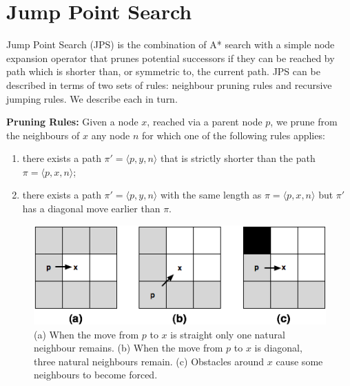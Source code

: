 \section{Jump Point Search}
\label{sec::jps}
Jump Point Search (JPS) is the combination of A* search with a simple
node expansion operator that prunes potential successors if
they can be reached by path which is shorter than, or symmetric to,
the current path. JPS can be described in terms of two sets of 
rules: neighbour pruning rules and recursive jumping rules.
We describe each in turn.

\textbf{Pruning Rules:}
Given a node $x$, reached via a parent node $p$,
we prune from the neighbours of $x$ any node $n$ for which one 
of the following rules applies:
\begin{enumerate}
\item 
  there exists a path $\pi' = \langle p,y,n \rangle$
  that is strictly shorter than the path $\pi = \langle p,x,n \rangle$; 
\item 
  there exists a path $\pi' = \langle p,y,n \rangle$ 
  with the same length as $\pi = \langle p,x,n \rangle$ but $\pi'$ has a 
  diagonal move earlier than $\pi$.  
\end{enumerate}

\begin{figure}[b]
       \begin{center}
		   \includegraphics[width=0.95\columnwidth]
			{diagrams/pruning.png}
       \end{center}
	\vspace{-3pt}
       \caption{(a) When the move from $p$ to $x$ is straight only one natural neighbour remains.
(b) When the move from $p$ to $x$ is diagonal, three natural neighbours remain. (c) Obstacles around $x$
cause some neighbours to become forced. }
       \label{fig:pruning}
\end{figure}

